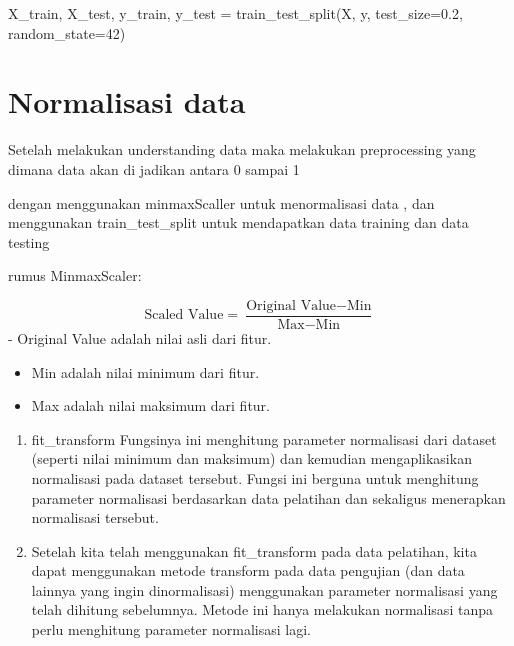 \documentclass[
  letterpaper,
]{krantz}
\makeatletter
\newenvironment{Shaded}{\begin{snugshade}}{\end{snugshade}}
\newcommand{\DecValTok}[1]{\textcolor[rgb]{0.68,0.00,0.00}{#1}}
\newcommand{\FloatTok}[1]{\textcolor[rgb]{0.68,0.00,0.00}{#1}}
\newcommand{\NormalTok}[1]{\textcolor[rgb]{0.00,0.23,0.31}{#1}}
\newcommand{\OperatorTok}[1]{\textcolor[rgb]{0.37,0.37,0.37}{#1}}
\newenvironment{kframe}{%
\medskip{}
\setlength{\fboxsep}{.8em}
 \def\at@end@of@kframe{}%
 \ifinner\ifhmode%
  \def\at@end@of@kframe{\end{minipage}}%
  \begin{minipage}{\columnwidth}%
 \fi\fi%
 \def\FrameCommand##1{\hskip\@totalleftmargin \hskip-\fboxsep
 \colorbox{shadecolor}{##1}\hskip-\fboxsep
     \hskip-\linewidth \hskip-\@totalleftmargin \hskip\columnwidth}%
 \MakeFramed {\advance\hsize-\width
   \@totalleftmargin\z@ \linewidth\hsize
   \@setminipage}}%
 {\par\unskip\endMakeFramed%
 \at@end@of@kframe}
\renewenvironment{Shaded}{\begin{kframe}}{\end{kframe}}
\makeatother
\begin{document}
\begin{Shaded}
\begin{Highlighting}[]
\NormalTok{X\_train, X\_test, y\_train, y\_test }\OperatorTok{=}\NormalTok{ train\_test\_split(X, y, test\_size}\OperatorTok{=}\FloatTok{0.2}\NormalTok{, random\_state}\OperatorTok{=}\DecValTok{42}\NormalTok{)}
\end{Highlighting}
\end{Shaded}

\hypertarget{normalisasi-data-1}{%
\section{Normalisasi data}\label{normalisasi-data-1}}

Setelah melakukan understanding data maka melakukan preprocessing yang
dimana data akan di jadikan antara 0 sampai 1

dengan menggunakan minmaxScaller untuk menormalisasi data , dan
menggunakan train\_test\_split untuk mendapatkan data training dan data
testing

rumus MinmaxScaler:

\[
\text{Scaled Value} = \frac{\text{Original Value} - \text{Min}}{\text{Max} - \text{Min}}
\] - Original Value adalah nilai asli dari fitur.

\begin{itemize}
\item
  Min adalah nilai minimum dari fitur.
\item
  Max adalah nilai maksimum dari fitur.
\end{itemize}

\begin{enumerate}
\def\labelenumi{\arabic{enumi}.}
\item
  fit\_transform Fungsinya ini menghitung parameter normalisasi dari
  dataset (seperti nilai minimum dan maksimum) dan kemudian
  mengaplikasikan normalisasi pada dataset tersebut. Fungsi ini berguna
  untuk menghitung parameter normalisasi berdasarkan data pelatihan dan
  sekaligus menerapkan normalisasi tersebut.
\item
  Setelah kita telah menggunakan fit\_transform pada data pelatihan,
  kita dapat menggunakan metode transform pada data pengujian (dan data
  lainnya yang ingin dinormalisasi) menggunakan parameter normalisasi
  yang telah dihitung sebelumnya. Metode ini hanya melakukan normalisasi
  tanpa perlu menghitung parameter normalisasi lagi.
\end{enumerate}
\end{document}
